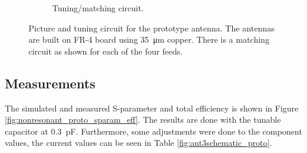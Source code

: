 \begin{figure}[htbp]
\begin{subfigure}[b]{0.49\linewidth}
        \caption{Tuning/matching circuit.}
        \label{fig:ant3schematic}
    \end{subfigure}
    \caption{Picture and tuning circuit for the prototype antenna.  The antennas are built on FR-4 board using \SI{35}{\micro\meter} copper. There is a matching circuit as shown for each of the four feeds.}
    \label{fig:ant3techschem_proto}
\end{figure}


\subsection{Measurements}
The simulated and measured S-parameter and total efficiency is shown in Figure \ref{fig:nonresonant_proto_sparam_eff}. The results are done with the tunable capacitor at \SI{0.3}{pF}. Furthermore, some adjustments were done to the component values, the current values can be seen in Table \ref{fig:ant3schematic_proto}. 

